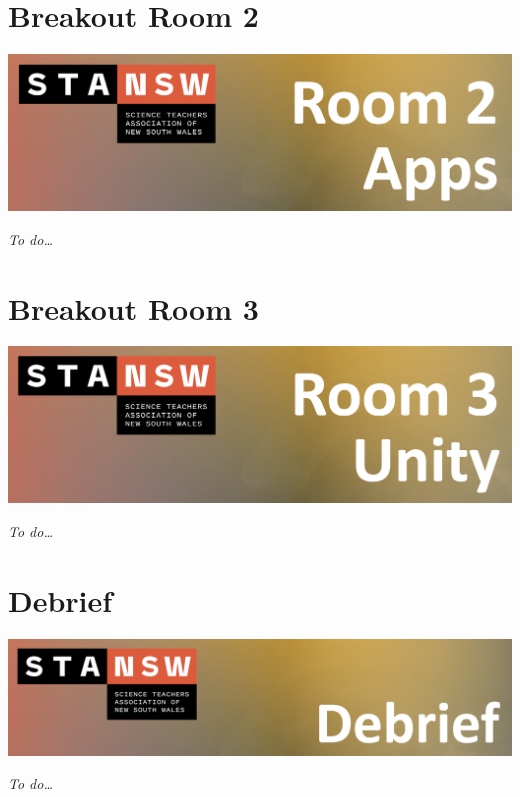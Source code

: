 \documentclass[
]{book}
\begin{document}
\hypertarget{Room-2}{%
\chapter{Breakout Room 2}\label{Room-2}}

\includegraphics[width=26.19in]{images/Room_2}

\emph{To do\ldots{}}

\hypertarget{Room-3}{%
\chapter{Breakout Room 3}\label{Room-3}}

\includegraphics[width=26.08in]{images/Room_3}

\emph{To do\ldots{}}

\hypertarget{Debrief}{%
\chapter{Debrief}\label{Debrief}}

\includegraphics[width=27.17in]{images/Debrief}

\emph{To do\ldots{}}
\end{document}
